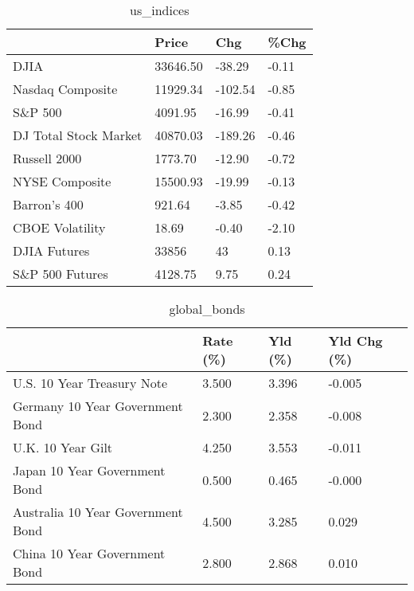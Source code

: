 \documentclass{article}%
\begin{document}
%


\begin{table}[htbp]%
\caption{us\_indices}%
\centering%
\begin{adjustbox}{width=1\textwidth}%
\begin{tabular}{llll}
\toprule
                      &    Price &     Chg &  \%Chg \\
\midrule
                 DJIA & 33646.50 &  -38.29 & -0.11 \\
     Nasdaq Composite & 11929.34 & -102.54 & -0.85 \\
              S\&P 500 &  4091.95 &  -16.99 & -0.41 \\
DJ Total Stock Market & 40870.03 & -189.26 & -0.46 \\
         Russell 2000 &  1773.70 &  -12.90 & -0.72 \\
       NYSE Composite & 15500.93 &  -19.99 & -0.13 \\
         Barron's 400 &   921.64 &   -3.85 & -0.42 \\
      CBOE Volatility &    18.69 &   -0.40 & -2.10 \\
         DJIA Futures &    33856 &      43 &  0.13 \\
      S\&P 500 Futures &  4128.75 &    9.75 &  0.24 \\
\bottomrule
\end{tabular}
%
\end{adjustbox}%
\end{table}

%


\begin{table}[htbp]%
\caption{global\_bonds}%
\centering%
\begin{adjustbox}{width=1\textwidth}%
\begin{tabular}{llll}
\toprule
                                  & Rate (\%) & Yld (\%) & Yld Chg (\%) \\
\midrule
       U.S. 10 Year Treasury Note &    3.500 &   3.396 &      -0.005 \\
  Germany 10 Year Government Bond &    2.300 &   2.358 &      -0.008 \\
                U.K. 10 Year Gilt &    4.250 &   3.553 &      -0.011 \\
    Japan 10 Year Government Bond &    0.500 &   0.465 &      -0.000 \\
Australia 10 Year Government Bond &    4.500 &   3.285 &       0.029 \\
    China 10 Year Government Bond &    2.800 &   2.868 &       0.010 \\
\bottomrule
\end{tabular}
%
\end{adjustbox}%
\end{table}
\end{document}
